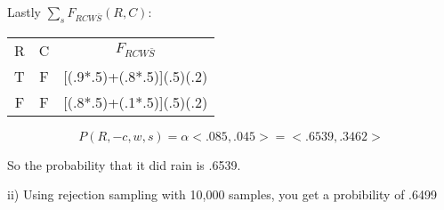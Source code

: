 \documentclass[12pt]{article}
\begin{document}
\pagebreak
Lastly $\sum_s F_{RCW\bar{S}}(R,C):$

\begin{table}[h!]
  \begin{tabular}{|c|c|c|}
    \hline
    R & C & $F_{RCW\bar{S}}$ \\
    T & F & [(.9*.5)+(.8*.5)](.5)(.2) \\
    F & F & [(.8*.5)+(.1*.5)](.5)(.2) \\
    \hline 
  \end{tabular}
\end{table}

\begin{equation}
P(R,-c,w,s) =  \alpha<.085,.045> = <.6539,.3462>
\end{equation}

So the probability that it did rain is .6539.

ii) Using rejection sampling with 10,000 samples, you get a probibility of 
.6499
\end{document}
